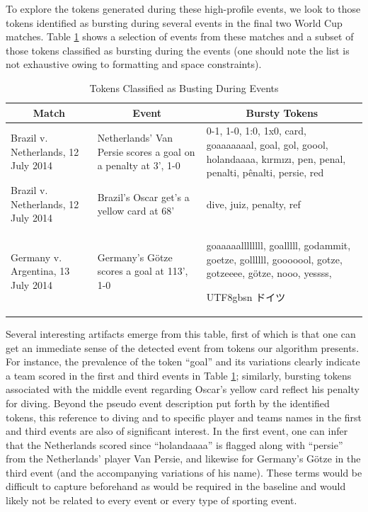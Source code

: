 \documentclass{acm_proc_article-sp}
\newcommand{\myfont}{gbsn}
\begin{document}
To explore the tokens generated during these high-profile events, we look to those tokens identified as bursting during several events in the final two World Cup matches.
Table \ref{tab:burstyTokens} shows a selection of events from these matches and a subset of those tokens classified as bursting during the events (one should note the list is not exhaustive owing to formatting and space constraints).

\begin{table}[htdp]
\caption{Tokens Classified as Busting During Events}
\begin{center}
\begin{tabular}{|p{0.75in}|p{0.7in}| p{1.45in} |}
\hline
\multicolumn{1}{|c|}{\textbf{Match}} & \multicolumn{1}{|c|}{\textbf{Event}} & \multicolumn{1}{|c|}{\textbf{Bursty Tokens}} \\ \hline
Brazil v. Netherlands, 12 July 2014 & Netherlands' Van Persie scores a goal on a penalty at 3', 1-0 & 0-1, 1-0, 1:0, 1x0, card, goaaaaaaal, goal, gol, goool, holandaaaa, k\i{}rm\i{}z\i{}, pen, penal, penalti, p\^{e}nalti, persie, red \\ \hline
Brazil v. Netherlands, 12 July 2014 & Brazil's Oscar get's a yellow card at 68' & dive, juiz, penalty, ref \\ \hline
Germany v. Argentina, 13 July 2014 & Germany's G\"{o}tze scores a goal at 113', 1-0 & goaaaaallllllll, goalllll, godammit, goetze, gollllll, gooooool, gotze, gotzeeee, g\"{o}tze, nooo, yessss, \begin{CJK}{UTF8}{\myfont} ドイツ\end{CJK} \\ \hline
\end{tabular}
\end{center}
\label{tab:burstyTokens}
\end{table}

Several interesting artifacts emerge from this table, first of which is that one can get an immediate sense of the detected event from tokens our algorithm presents. 
For instance, the prevalence of the token ``goal'' and its variations clearly indicate a team scored in the first and third events in Table \ref{tab:burstyTokens}; similarly, bursting tokens associated with the middle event regarding Oscar's yellow card reflect his penalty for diving.
Beyond the pseudo event description put forth by the identified tokens, this reference to diving and to specific player and teams names in the first and third events are also of significant interest.
In the first event, one can infer that the Netherlands scored since ``holandaaaa'' is flagged along with ``persie'' from the Netherlands' player Van Persie, and likewise for Germany's G\"{o}tze in the third event (and the accompanying variations of his name).
These terms would be difficult to capture beforehand as would be required in the baseline and would likely not be related to every event or every type of sporting event.
\end{document}

